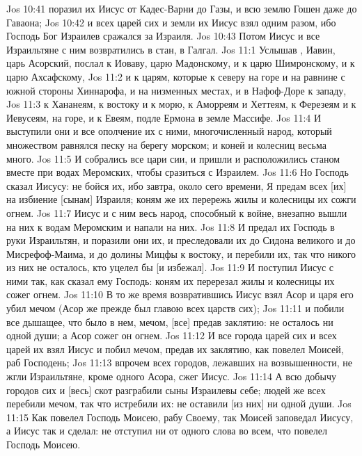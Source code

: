 \vs Jos 10:41 поразил их Иисус от Кадес-Варни до Газы, и всю землю Гошен даже до Гаваона;
\vs Jos 10:42 и всех царей сих и земли их Иисус взял одним разом, ибо Господь Бог Израилев сражался за Израиля.
\vs Jos 10:43 Потом Иисус и все Израильтяне с ним возвратились в стан, в Галгал.
\vs Jos 11:1 Услышав , Иавин, царь Асорский, послал к Иоваву, царю Мадонскому, и к царю Шимронскому, и к царю Ахсафскому,
\vs Jos 11:2 и к царям, которые  к северу на горе и на равнине с южной стороны Хиннарофа, и на низменных местах, и в Нафоф-Доре к западу,
\vs Jos 11:3 к Хананеям,  к востоку и к морю, к Аморреям и Хеттеям, к Ферезеям и к Иевусеям,  на горе, и к Евеям,  подле Ермона в земле Массифе.
\vs Jos 11:4 И выступили они и все ополчение их с ними, многочисленный народ, который множеством равнялся песку на берегу морском; и коней и колесниц  весьма много.
\vs Jos 11:5 И собрались все цари сии, и пришли и расположились станом вместе при водах Меромских, чтобы сразиться с Израилем.
\vs Jos 11:6 Но Господь сказал Иисусу: не бойся их, ибо завтра, около сего времени, Я предам всех [их] на избиение [сынам] Израиля; коням же их перережь жилы и колесницы их сожги огнем.
\rsbpar\vs Jos 11:7 Иисус и с ним весь народ, способный к войне, внезапно вышли на них к водам Меромским и напали на них.
\vs Jos 11:8 И предал их Господь в руки Израильтян, и поразили они их, и преследовали их до Сидона великого и до Мисрефоф-Маима, и до долины Мицфы к востоку, и перебили их, так что никого из них не осталось, кто уцелел бы [и избежал].
\vs Jos 11:9 И поступил Иисус с ними так, как сказал ему Господь: коням их перерезал жилы и колесницы их сожег огнем.
\vs Jos 11:10 В то же время возвратившись Иисус взял Асор и царя его убил мечом (Асор же прежде был главою всех царств сих);
\vs Jos 11:11 и побили все дышащее, что было в нем, мечом, [все] предав заклятию: не осталось ни одной души; а Асор сожег он огнем.
\vs Jos 11:12 И все города царей сих и всех царей их взял Иисус и побил мечом, предав их заклятию, как повелел Моисей, раб Господень;
\vs Jos 11:13 впрочем всех городов, лежавших на возвышенности, не жгли Израильтяне, кроме одного Асора,  сжег Иисус.
\vs Jos 11:14 А всю добычу городов сих и [весь] скот разграбили сыны Израилевы себе; людей же всех перебили мечом, так что истребили  их: не оставили [из них] ни одной души.
\vs Jos 11:15 Как повелел Господь Моисею, рабу Своему, так Моисей заповедал Иисусу, а Иисус так и сделал: не отступил ни от одного слова во всем, что повелел Господь Моисею.

